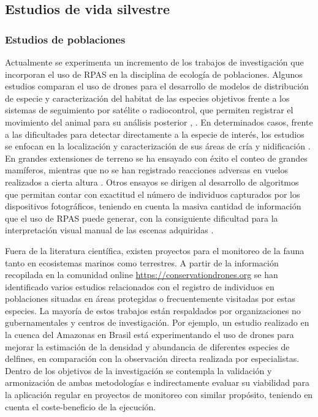 \documentclass[11pt,]{article}
\begin{document}
\subsection{Estudios de vida
silvestre}\label{estudios-de-vida-silvestre}

\subsubsection{Estudios de poblaciones}\label{estudios-de-poblaciones}

Actualmente se experimenta un incremento de los trabajos de
investigación que incorporan el uso de RPAS en la disciplina de ecología
de poblaciones. Algunos estudios comparan el uso de drones para el
desarrollo de modelos de distribución de especie y caracterización del
habitat de las especies objetivos frente a los sistemas de seguimiento
por satélite o radiocontrol, que permiten registrar el movimiento del
animal para su análisis posterior \citep{PazmanyMulero2015},
\citep{Mulero-Pazmany2015}. En determinados casos, frente a las
dificultades para detectar directamente a la especie de interés, los
estudios se enfocan en la localización y caracterización de sus áreas de
cría y nidificación \citep{VanAndel2015}. En grandes extensiones de
terreno se ha ensayado con éxito el conteo de grandes mamíferos,
mientras que no se han registrado reacciones adversas en vuelos
realizados a cierta altura \citep{Schiffman2014}. Otros ensayos se
dirigen al desarrollo de algoritmos que permitan contar con exactitud el
número de individuos capturados por los dispositivos fotográficos,
teniendo en cuenta la masiva cantidad de información que el uso de RPAS
puede generar, con la consiguiente dificultad para la interpretación
visual manual de las escenas adquiridas
\citep{Lhoest2015}\citep{Abd-Elrahman2005a}.

Fuera de la literatura científica, existen proyectos para el monitoreo
de la fauna tanto en ecosistemas marinos como terrestres. A partir de la
información recopilada en la comunidad online
\url{https://conservationdrones.org} se han identificado varios estudios
relacionados con el registro de individuos en poblaciones situadas en
áreas protegidas o frecuentemente visitadas por estas especies. La
mayoría de estos trabajos están respaldados por organizaciones no
gubernamentales y centros de investigación. Por ejemplo, un estudio
realizado en la cuenca del Amazonas en Brasil está experimentando el uso
de drones para mejorar la estimación de la densidad y abundancia de
diferentes especies de delfines, en comparación con la observación
directa realizada por especialistas. Dentro de los objetivos de la
investigación se contempla la validación y armonización de ambas
metodologías e indirectamente evaluar su viabilidad para la aplicación
regular en proyectos de monitoreo con similar propósito, teniendo en
cuenta el coste-beneficio de la ejecución.
\end{document}
